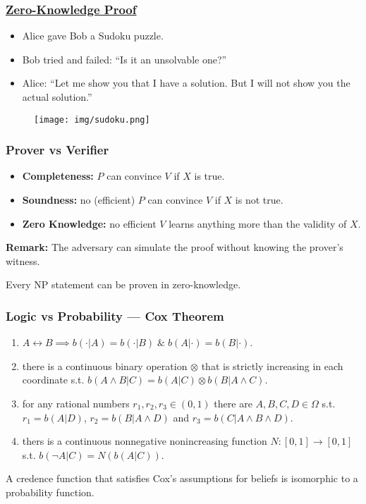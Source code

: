 \documentclass[UTF8,11pt,colorlinks,compress,openany]{beamer}%
\begin{document}
\begin{frame}\frametitle{\href{https://zhuanlan.zhihu.com/p/34072069}{Zero-Knowledge Proof}}
	\begin{itemize}
		\item Alice gave Bob a Sudoku puzzle.
		\item Bob tried and failed: ``Is it an unsolvable one?''
		\item Alice: ``Let me show you that I have a solution. But I will not show you the actual solution.''
	\end{itemize}
\begin{figure}
\texttt{[image: img/sudoku.png]}
\end{figure}
\end{frame}

\begin{frame}\frametitle{Prover vs Verifier}
	\begin{itemize}
		\item \textbf{Completeness:} $P$ can convince $V$ if $X$ is true.
		\item \textbf{Soundness:} no (efficient) $P$ can convince $V$ if $X$ is not true.
		\item \textbf{Zero Knowledge:} no efficient $V$ learns anything more than the validity of $X$.
	\end{itemize}
	\textbf{Remark:} The adversary can simulate the proof without knowing the prover's witness.
	\begin{theorem}
		Every NP statement can be proven in zero-knowledge.
	\end{theorem}
\end{frame}

\begin{frame}\frametitle{Logic vs Probability --- Cox Theorem}
\begin{center}
\end{center}
\begin{assumption}
\begin{enumerate}
	\item $A\leftrightarrow B\implies b(\cdot|A)=b(\cdot|B)\;\&\;b(A|\cdot)=b(B|\cdot)$.
	\item there is a continuous binary operation $\otimes$ that is strictly increasing in each coordinate s.t. $b(A\wedge B|C)=b(A|C)\otimes b(B|A\wedge C)$.
	\item for any rational numbers $r_1,r_2,r_3\in (0,1)$ there are $A,B,C,D\in\Omega$ s.t. $r_1=b(A|D)$, $r_2=b(B|A\wedge D)$ and $r_3=b(C|A\wedge B\wedge D)$.
	\item thers is a continuous nonnegative nonincreasing function $N: [0,1]\to [0,1]$ s.t. $b(\neg A|C)=N(b(A|C))$.
\end{enumerate}
\end{assumption}
\begin{theorem}
A credence function that satisfies Cox's assumptions for beliefs is isomorphic to a probability function.
\end{theorem}
\end{frame}
\end{document}

